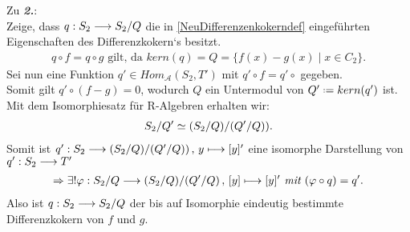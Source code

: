\documentclass[10pt,a4paper]{report}
\newcommand{\comment}[1]{}
\newcommand{\functionfront}[3]{\nolinebreak{#1:#2 \longrightarrow #3}}
\newcommand{\function}[5]{\nolinebreak{#1:#2 \longrightarrow #3 \, , \, #4 \longmapsto #5}}
\newcommand*{\defeq}{\mathrel{\vcenter{\baselineskip0.5ex \lineskiplimit0pt
                     \hbox{\scriptsize.}\hbox{\scriptsize.}}}%
                     =}
\newcommand{\kernel}[1]{kern(#1)}
\begin{document}
Zu \textit{\textbf{2.}}:\\
Zeige, dass $\functionfront{q}{S_2}{S_2/Q}$ die in \cref{NeuDifferenzenkokerndef} eingeführten Eigenschaften des Differenzkokern`s  besitzt.
\begin{gather*}
q \circ f = q \circ g \text{ gilt, da } \kernel{q} = Q = \lbrace f(x) - g(x)\mid x \in C_2 \rbrace.
\end{gather*}
Sei nun eine Funktion $q' \in Hom_{\mathcal{A}}(S_2,T')$ mit $q' \circ f = q' \circ$ gegeben.\\
Somit gilt $q' \circ (f - g) = 0$, wodurch $Q$ ein Untermodul von $Q' \defeq \kernel{q'}$ ist.\\ Mit dem Isomorphiesatz \comment{HOMOMORPHIESATZ [kommutative Algebra 2.10]} für R-Algebren erhalten wir:
\begin{gather*}
 \nolinebreak{S_2/Q' \simeq (S_2/Q)/(Q'/Q))}.\\
\end{gather*}
Somit ist $\function{q'}{S_2}{(S_2/Q)/(Q'/Q))}{y}{[y]'}$ eine isomorphe Darstellung von $\functionfront{q'}{S_2}{T'}$\\
\begin{gather*}
\Rightarrow \exists ! \function{\varphi}{S_2/Q}{(S_2/Q)/(Q'/Q)}{[y]}{[y]'}\textit{ mit }(\varphi \circ q) = q'.
\end{gather*}
Also ist $\functionfront{q}{S_2}{S_2/Q}$ der bis auf Isomorphie eindeutig bestimmte Differenzkokern von $f$ und $g$.
\end{document}
